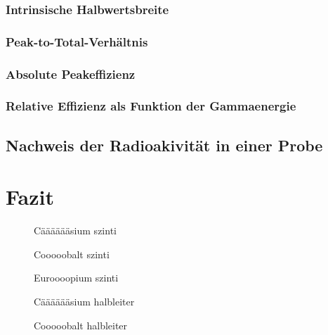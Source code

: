 \documentclass[11pt, a4paper]{article}
\numberwithin{equation}{section}
\begin{document}
\subsubsection{Intrinsische Halbwertsbreite}

\subsubsection{Peak-to-Total-Verhältnis}

\subsubsection{Absolute Peakeffizienz}

\subsubsection{Relative Effizienz als Funktion der Gammaenergie}

\subsection{Nachweis der Radioakivität in einer Probe}

\section{Fazit}

\begin{figure}[h]
	\centering
	
	\caption{Cääääääsium szinti}
	\label{fig:szin_caesium_spektrum}
\end{figure}

\begin{figure}[h]
	\centering
	
	\caption{Cooooobalt szinti}
	\label{fig:szin_cobalt_spektrum}
\end{figure}

\begin{figure}[h]
	\centering
	
	\caption{Euroooopium szinti}
	\label{fig:szin_europium_spektrum}
\end{figure}

\begin{figure}[h]
	\centering
	
	\caption{Cääääääsium halbleiter}
	\label{fig:halb_caesium_spektrum}
\end{figure}

\begin{figure}[h]
	\centering
	
	\caption{Cooooobalt halbleiter}
	\label{fig:halb_cobalt_spektrum}
\end{figure}
\end{document}
